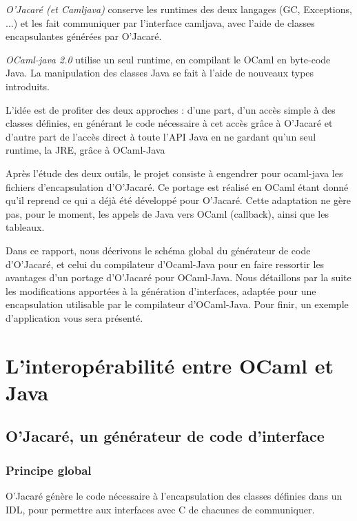 \documentclass[a4paper, 11pt, notitlepage]{article}
\begin{document}
\emph{O’Jacaré (et Camljava)} conserve les runtimes des deux langages (GC,
Exceptions, ...) et les fait communiquer par l'interface camljava,
avec l'aide de classes encapsulantes générées par O'Jacaré.

\emph{OCaml-java
  2.0} utilise un seul runtime, en compilant le OCaml en byte-code
Java. La manipulation des classes Java se fait à l'aide de nouveaux types introduits.
\newline

L'idée est de profiter des deux approches : d'une part, d'un accès simple à des classes
définies, en générant le code nécessaire à cet accès grâce à O'Jacaré
et d'autre part de l'accès direct à toute
l'API Java en ne gardant qu'un seul runtime, la
JRE, grâce à OCaml-Java

Après l’étude des deux outils, le projet consiste à engendrer pour
ocaml-java les fichiers d’encapsulation d'O’Jacaré. Ce
portage est réalisé en OCaml étant donné qu'il reprend ce qui
a déjà été développé pour O’Jacaré. Cette adaptation ne gère pas, pour
le moment, les appels de Java vers OCaml (callback), ainsi que les tableaux.
\newline

Dans ce rapport, nous décrivons le schéma global du
générateur de code d'O'Jacaré, et celui du compilateur d'Ocaml-Java
pour en faire ressortir les avantages d'un portage d'O'Jacaré pour OCaml-Java.
Nous détaillons par la suite les modifications apportées à la
génération d'interfaces, adaptée pour une encapsulation utilisable par
le compilateur d'OCaml-Java.
Pour finir, un exemple d'application vous sera présenté.










\newpage

\section{L'interopérabilité entre OCaml et Java}


\subsection{O'Jacaré, un générateur de code d'interface}



\subsubsection{Principe global}
O'Jacaré génère le code nécessaire à l'encapsulation des classes
définies dans un IDL, pour permettre aux interfaces avec C de chacunes
de communiquer.
\end{document}
